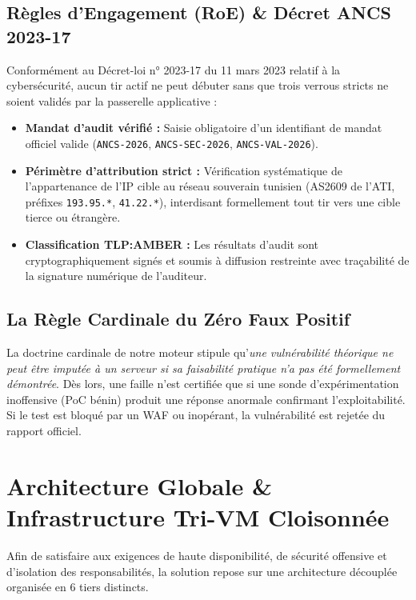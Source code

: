 \documentclass[11pt,a4paper,oneside]{article}
\begin{document}
\subsection{Règles d'Engagement (RoE) \& Décret ANCS 2023-17}
Conformément au Décret-loi n° 2023-17 du 11 mars 2023 relatif à la cybersécurité, aucun tir actif ne peut débuter sans que trois verrous stricts ne soient validés par la passerelle applicative :
\begin{itemize}
    \item \textbf{Mandat d'audit vérifié :} Saisie obligatoire d'un identifiant de mandat officiel valide (\texttt{ANCS-2026}, \texttt{ANCS-SEC-2026}, \texttt{ANCS-VAL-2026}).
    \item \textbf{Périmètre d'attribution strict :} Vérification systématique de l'appartenance de l'IP cible au réseau souverain tunisien (AS2609 de l'ATI, préfixes \texttt{193.95.*}, \texttt{41.22.*}), interdisant formellement tout tir vers une cible tierce ou étrangère.
    \item \textbf{Classification TLP:AMBER :} Les résultats d'audit sont cryptographiquement signés et soumis à diffusion restreinte avec traçabilité de la signature numérique de l'auditeur.
\end{itemize}

\subsection{La Règle Cardinale du Zéro Faux Positif}
La doctrine cardinale de notre moteur stipule qu'\textit{une vulnérabilité théorique ne peut être imputée à un serveur si sa faisabilité pratique n'a pas été formellement démontrée}. Dès lors, une faille n'est certifiée que si une sonde d'expérimentation inoffensive (PoC bénin) produit une réponse anormale confirmant l'exploitabilité. Si le test est bloqué par un WAF ou inopérant, la vulnérabilité est rejetée du rapport officiel.

\section{Architecture Globale \& Infrastructure Tri-VM Cloisonnée}

Afin de satisfaire aux exigences de haute disponibilité, de sécurité offensive et d'isolation des responsabilités, la solution repose sur une architecture découplée organisée en 6 tiers distincts.
\end{document}
